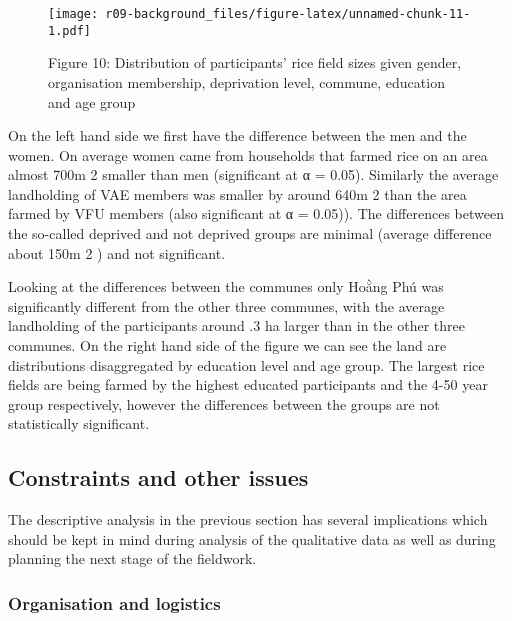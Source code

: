 \documentclass[]{article}
\begin{document}
\begin{figure}
\centering
\texttt{[image: r09-background\_files/figure-latex/unnamed-chunk-11-1.pdf]}
\caption{Figure 10: Distribution of participants' rice field sizes given
gender, organisation membership, deprivation level, commune, education
and age group}
\end{figure}

On the left hand side we first have the difference between the men and
the women. On average women came from households that farmed rice on an
area almost 700m 2 smaller than men (significant at α = 0.05). Similarly
the average landholding of VAE members was smaller by around 640m 2 than
the area farmed by VFU members (also significant at α = 0.05)). The
differences between the so-called deprived and not deprived groups are
minimal (average difference about 150m 2 ) and not significant.

Looking at the differences between the communes only Hoằng Phú was
significantly different from the other three communes, with the average
landholding of the participants around .3 ha larger than in the other
three communes. On the right hand side of the figure we can see the land
are distributions disaggregated by education level and age group. The
largest rice fields are being farmed by the highest educated
participants and the 4-50 year group respectively, however the
differences between the groups are not statistically significant.

\hypertarget{constraints-and-other-issues}{%
\subsection{Constraints and other
issues}\label{constraints-and-other-issues}}

The descriptive analysis in the previous section has several
implications which should be kept in mind during analysis of the
qualitative data as well as during planning the next stage of the
fieldwork.

\hypertarget{organisation-and-logistics}{%
\subsubsection{Organisation and
logistics}\label{organisation-and-logistics}}
\end{document}
